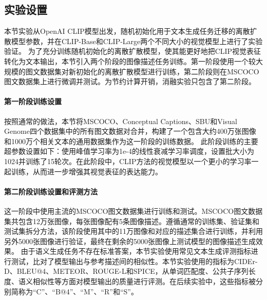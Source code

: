 \subsection{实验设置}
\label{sec:ddcap-exp-setting}
本节实验从OpenAI CLIP模型\cite{radford2021learning}出发，随机初始化用于文本生成任务迁移的离散扩散模型参数，并在CLIP-Base和CLIP-Large两个不同大小的视觉模型上进行了实验验证。
为了充分训练随机初始化的离散扩散模型，使其能更好地把CLIP视觉表征转化为文本输出，本节引入两个阶段的图像描述任务训练。第一阶段使用一个较大规模的图文数据集对新初始化的离散扩散模型进行训练，第二阶段则在MSCOCO图文数据集上进行微调并测试。为节约计算开销，消融实验只包含了第二阶段。

\paragraph{第一阶段训练设置} 按照通常的做法\cite{uniter, meter}，本节将MSCOCO\cite{chen2015microsoft}、Conceptual Captions\cite{sharma-etal-2018-conceptual}、SBU\cite{sbu}和Visual Genome\cite{krishna2017visual}四个数据集中的所有图文数据对合并，构建了一个包含大约400万张图像和1000万个相关文本的通用数据集作为这一阶段的训练数据。
此阶段训练的主要超参数设置如下：使用峰值学习率为1e-4的线性衰减学习率调度，设置批大小为1024并训练了15轮次。在此阶段中，CLIP方法的视觉模型以一个更小的学习率一起训练，从而进一步增强其视觉表征的表达能力。%

\paragraph{第二阶段训练设置和评测方法} 
这一阶段中使用主流的MSCOCO图文数据集进行训练和测试。MSCOCO图文数据集共包含12万张图像，每张图像配有5条图像描述。遵循通常的训练集、验证集和测试集拆分方法\cite{karpathy2015deep}，该阶段使用其中的11万图像和对应的描述集合进行训练，并利用另外5000张图像进行验证，最终在剩余的5000张图像上测试模型的图像描述生成效果。
由于语义生成任务不存在标准答案，本节实验使用常见文本生成评测指标进行测试，比对了模型输出与参考描述间的相似性。本节实验使用的指标为CIDEr-D\cite{cider}、BLEU@4\cite{bleu}、METEOR\cite{meteor}、ROUGE-L\cite{rouge}和SPICE\cite{spice}，从单词匹配度、公共子序列长度、语义相似性等方面对模型输出的质量进行评测。在后续实验中，这些指标被分别简称为“C”、“B@4”、“M”、“R”和“S”。

